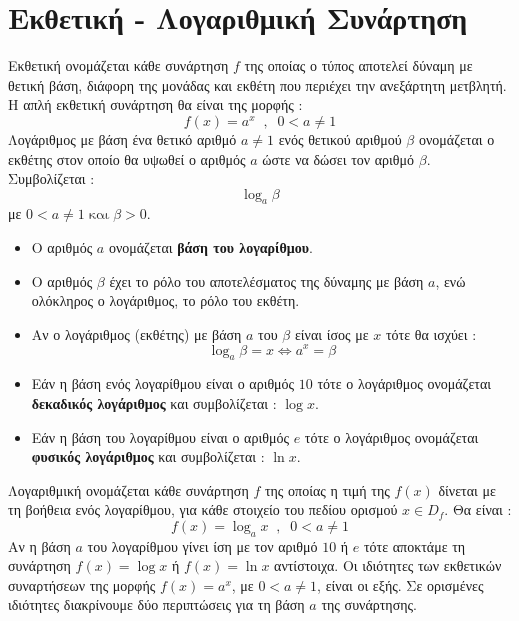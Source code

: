 \documentclass[twoside,nofonts,internet,shmeiwseis]{thewria}
\begin{document}
\section{Εκθετική - Λογαριθμική Συνάρτηση}
\orismoi
{}
Εκθετική ονομάζεται κάθε συνάρτηση $ f $ της οποίας ο τύπος αποτελεί δύναμη με θετική βάση, διάφορη της μονάδας και εκθέτη που περιέχει την ανεξάρτητη μετβλητή. Η απλή εκθετική συνάρτηση θα είναι της μορφής :
\[ f(x)=a^x\;\;,\;\;0<a\neq1 \]
Λογάριθμος με βάση ένα θετικό αριθμό $ a\neq1 $ ενός θετικού αριθμού $ \beta $ ονομάζεται ο εκθέτης στον οποίο θα υψωθεί ο αριθμός $ a $ ώστε να δώσει τον αριθμό $ \beta $. Συμβολίζεται :
\[ \log_{a}{\beta} \]
με $ 0<a\neq1\;\textrm{και}\; \beta>0 $.
\begin{itemize}[itemsep=0mm]
\item Ο αριθμός $ a $ ονομάζεται \textbf{βάση του λογαρίθμου}.
\item Ο αριθμός $ \beta $ έχει το ρόλο του αποτελέσματος της δύναμης με βάση $ a $, ενώ ολόκληρος ο λογάριθμος, το ρόλο του εκθέτη.
\item Αν ο λογάριθμος (εκθέτης) με βάση $ a $ του $ \beta $ είναι ίσος με $ x $ τότε θα ισχύει :
\[ \log_{a}{\beta}=x\Leftrightarrow a^x=\beta \]
\item Εάν η βάση ενός λογαρίθμου είναι ο αριθμός $ 10 $ τότε ο λογάριθμος ονομάζεται \textbf{δεκαδικός λογάριθμος} και συμβολίζεται : $ \log{x} $.
\item Εάν η βάση του λογαρίθμου είναι ο αριθμός $ e $ τότε ο λογάριθμος ονομάζεται \textbf{φυσικός λογάριθμος} και συμβολίζεται : $ \ln{x} $.
\end{itemize}
Λογαριθμική ονομάζεται κάθε συνάρτηση $ f $ της οποίας η τιμή της $ f(x) $ δίνεται με τη βοήθεια ενός λογαρίθμου, για κάθε στοιχείο του πεδίου ορισμού $ x\in D_f $. Θα είναι :
\[ f(x)=\log_ax\;\;,\;\;0<a\neq1 \]
Αν η βάση $ a $ του λογαρίθμου γίνει ίση με τον αριθμό $ 10 $ ή $ e $ τότε αποκτάμε τη συνάρτηση $ f(x)=\log{x} $ ή $ f(x)=\ln{x} $ αντίστοιχα.
\thewrhmata
{}
Οι ιδιότητες των εκθετικών συναρτήσεων της μορφής $ f(x)=a^x $, με $ 0<a\neq1 $, είναι οι εξής. Σε ορισμένες ιδιότητες διακρίνουμε δύο περιπτώσεις για τη βάση $ a $ της συνάρτησης.
\end{document}
